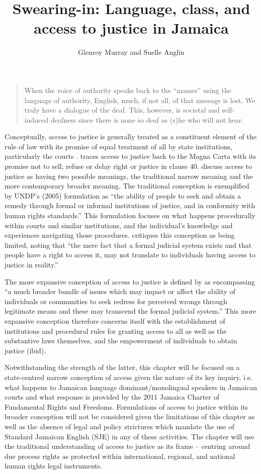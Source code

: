 \documentclass[output=paper,colorlinks,citecolor=brown]{langscibook}
\title[Swearing-in]{Swearing-in: Language, class, and access to justice in Jamaica}
\author{Glenroy Murray\affiliation{Equality for All Jamaica} and Suelle Anglin\affiliation{Equality for All Jamaica}}
\begin{document}
\maketitle


\begin{quote}
    When the voice of authority speaks back to the “masses” using the language of authority, English, much, if not all, of that message is lost. We truly have a dialogue of the deaf. This, however, is societal and self-induced deafness since there is none so deaf as (s)he who will not hear. \citep{Devonish2014}
\end{quote}

Conceptually, access to justice is generally treated as a constituent element of the rule of law with its promise of equal treatment of all by state institutions, particularly the courts \citep{Agrast2008}. \citet{Rhode2004} traces access to justice back to the Magna Carta with its promise not to sell, refuse or delay right or justice in clause 40. \citet{GhaiCottrell2010} discuss access to justice as having two possible meanings, the traditional narrow meaning and the more contemporary broader meaning. The traditional conception is exemplified by UNDP’s (2005) formulation as “the ability of people to seek and obtain a remedy through formal or informal institutions of justice, and in conformity with human rights standards.” This formulation focuses on what happens procedurally within courts and similar institutions, and the individual’s knowledge and experiences navigating those procedures. \citet[5]{Dias2011} critiques this conception as being limited, noting that “the mere fact that a formal judicial system exists and that people have a right to access it, may not translate to individuals having access to justice in reality.”

The more expansive conception of access to justice is defined by \citet[5]{Dias2011} as encompassing “a much broader bundle of issues which may impact or affect the ability of individuals or communities to seek redress for perceived wrongs through legitimate means and these may transcend the formal judicial system.” This more expansive conception therefore concerns itself with the establishment of institutions and procedural rules for granting access to all as well as the substantive laws themselves, and the empowerment of individuals to obtain justice (ibid).

Notwithstanding the strength of the latter, this chapter will be focused on a state-centred narrow conception of access given the nature of its key inquiry, i.e. what happens to Jamaican language dominant/monolingual speakers in Jamaican courts and what response is provided by the 2011 Jamaica Charter of Fundamental Rights and Freedoms. Formulations of access to justice within its broader conception will not be considered given the limitations of this chapter as well as the absence of legal and policy strictures which mandate the use of Standard Jamaican English (SJE) in any of these activities. The chapter will use the traditional understanding of access to justice as its frame – centring around due process rights as protected within international, regional, and national human rights legal instruments.
\end{document}
